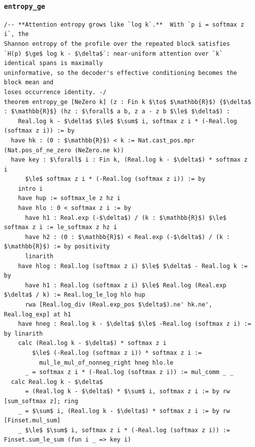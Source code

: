\documentclass[11pt]{article}
\begin{document}
\subsubsection*{\texttt{entropy\_ge}}

\begin{lstlisting}
/-- **Attention entropy grows like `log k`.**  With `p i = softmax z i`, the
Shannon entropy of the profile over the repeated block satisfies
`H(p) $\ge$ log k - $\delta$`: near-uniform attention over `k` identical spans is maximally
uninformative, so the decoder's effective conditioning becomes the block mean and
loses occurrence identity. -/
theorem entropy_ge [NeZero k] (z : Fin k $\to$ $\mathbb{R}$) {$\delta$ : $\mathbb{R}$} (hz : $\forall$ a b, z a - z b $\le$ $\delta$) :
    Real.log k - $\delta$ $\le$ $\sum$ i, softmax z i * (-Real.log (softmax z i)) := by
  have hk : (0 : $\mathbb{R}$) < k := Nat.cast_pos.mpr (Nat.pos_of_ne_zero (NeZero.ne k))
  have key : $\forall$ i : Fin k, (Real.log k - $\delta$) * softmax z i
      $\le$ softmax z i * (-Real.log (softmax z i)) := by
    intro i
    have hup := softmax_le z hz i
    have hlo : 0 < softmax z i := by
      have h1 : Real.exp (-$\delta$) / (k : $\mathbb{R}$) $\le$ softmax z i := le_softmax z hz i
      have h2 : (0 : $\mathbb{R}$) < Real.exp (-$\delta$) / (k : $\mathbb{R}$) := by positivity
      linarith
    have hlog : Real.log (softmax z i) $\le$ $\delta$ - Real.log k := by
      have h1 : Real.log (softmax z i) $\le$ Real.log (Real.exp $\delta$ / k) := Real.log_le_log hlo hup
      rwa [Real.log_div (Real.exp_pos $\delta$).ne' hk.ne', Real.log_exp] at h1
    have hneg : Real.log k - $\delta$ $\le$ -Real.log (softmax z i) := by linarith
    calc (Real.log k - $\delta$) * softmax z i
        $\le$ (-Real.log (softmax z i)) * softmax z i :=
          mul_le_mul_of_nonneg_right hneg hlo.le
      _ = softmax z i * (-Real.log (softmax z i)) := mul_comm _ _
  calc Real.log k - $\delta$
      = (Real.log k - $\delta$) * $\sum$ i, softmax z i := by rw [sum_softmax z]; ring
    _ = $\sum$ i, (Real.log k - $\delta$) * softmax z i := by rw [Finset.mul_sum]
    _ $\le$ $\sum$ i, softmax z i * (-Real.log (softmax z i)) := Finset.sum_le_sum (fun i _ => key i)
\end{lstlisting}
\end{document}
